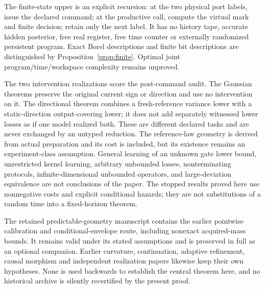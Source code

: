 The finite-state upper is an explicit recursion: at the two physical port labels, issue the declared command; at the productive call, compute the virtual mark and finite decision; retain only the next label. It has no history tape, accurate hidden posterior, free real register, free time counter or externally randomized persistent program. Exact Borel descriptions and finite bit descriptions are distinguished by Proposition~\ref{prop:finite}. Optimal joint program/time/workspace complexity remains unproved.

The two intervention realizations score the post-command audit. The Gaussian theorems preserve the original current sign or direction and use no intervention on it. The directional theorem combines a fresh-reference variance lower with a static-direction output-covering lower; it does not add separately witnessed lower losses as if one model realized both. These are different declared tasks and are never exchanged by an untyped reduction. The reference-law geometry is derived from actual preparation and its cost is included, but its existence remains an experiment-class assumption. General learning of an unknown gate lower bound, unrestricted kernel learning, arbitrary unbounded losses, nonterminating protocols, infinite-dimensional unbounded operators, and large-deviation equivalence are not conclusions of the paper. The stopped results proved here use nonnegative costs and explicit conditional hazards; they are not substitutions of a random time into a fixed-horizon theorem.

The retained predictable-geometry manuscript contains the earlier pointwise calibration and conditional-envelope route, including nonexact acquired-mass bounds. It remains valid under its stated assumptions and is preserved in full as an optional companion. Earlier curvature, continuation, adaptive refinement, causal morphism and independent realization papers likewise keep their own hypotheses. None is used backwards to establish the central theorem here, and no historical archive is silently recertified by the present proof.


